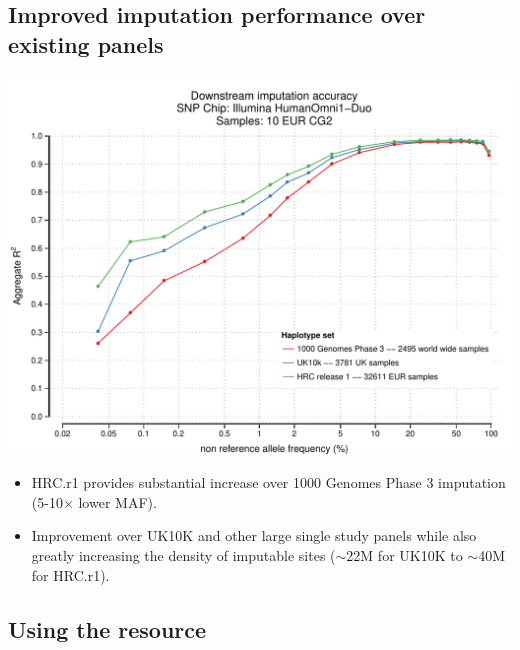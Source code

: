 \documentclass[a0,landscape]{a0poster}
\begin{document}
\begin{multicols}{3}
\vfill
\columnbreak


\subsection*{Improved imputation performance over existing panels}

\begin{center}\vspace{0.001cm}
\captionsetup{type=figure}
\includegraphics[width=0.7\linewidth]{images/bog20150430.pdf}
\end{center}\vspace{0.001cm}

\begin{itemize}
\setlength{\itemsep}{1pt}
\renewcommand{\labelitemi}{$\rightarrow$} 
\item HRC.r1 provides substantial increase over 1000 Genomes Phase 3 imputation (5-10$\times$ lower MAF).
\item Improvement over UK10K and other large single study panels while also greatly increasing the density of imputable sites ($\sim$22M for UK10K to $\sim$40M for HRC.r1).
\end{itemize}


\subsection*{Using the resource}


\end{multicols}
\end{document}
